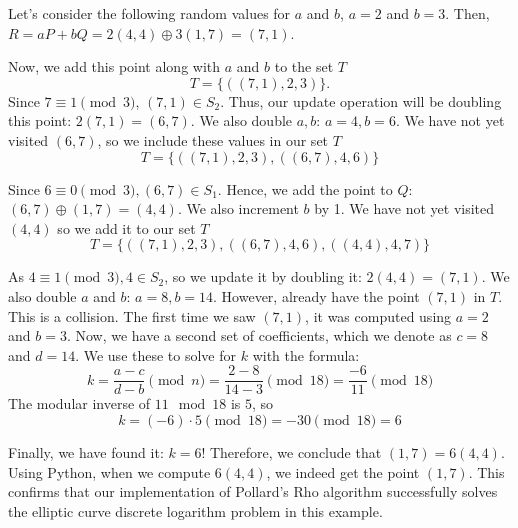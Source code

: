 \documentclass[11pt]{article}
\begin{document}
\vspace{0.3cm}

Let's consider the following random values for \(a\) and \(b\), \(a=2\) and \(b=3\). Then, \(R=aP+bQ=2(4,4)\oplus3(1,7)=(7,1)\).

Now, we add this point along with \(a\) and \(b\) to the set \(T\)
\[T=\{((7,1),2,3)\}.\]
Since \(7\equiv1 \pmod{3}\), \((7,1)\in S_2\). Thus, our update operation will be doubling this point: \(2(7,1)=(6,7)\). We also double \(a,b\): \(a=4,b=6\).
We have not yet visited \((6,7)\), so we include these values in our set \(T\)
\[T=\{((7,1),2,3), ((6,7),4,6)\}\]

Since \(6\equiv 0 \pmod{3},(6,7)\in S_1\). Hence, we add the point to \(Q\): \((6,7)\oplus (1,7)=(4,4)\). We also increment \(b\) by 1. We have not yet visited \((4,4)\) so we add it to our set \(T\)
\[T=\{((7,1),2,3), ((6,7),4,6), ((4,4),4,7)\}\]

As \(4\equiv 1 \pmod 3, 4\in S_2\), so we update it by doubling it: \(2(4,4)=(7,1)\).
We also double \(a\) and \(b\): \(a=8, b=14\). However, already have the point \((7,1)\) in \(T\). This is a collision. The first time we saw \((7,1)\), it was computed using \(a = 2\) and \(b = 3\). Now, we have a second set of coefficients, which we denote as \(c = 8\) and \(d = 14\). We use these to solve for \(k\) with the formula:
\[k = \frac{a - c}{d - b} \pmod{n} = \frac{2 - 8}{14 - 3} \pmod{18} = \frac{-6}{11} \pmod{18}\]
The modular inverse of \(11 \mod 18\) is \(5\), so
\[k = (-6) \cdot 5 \pmod{18} = -30 \pmod{18} = 6\]

Finally, we have found it: \(k = 6\)! Therefore, we conclude that \((1,7) = 6(4,4)\). Using Python, when we compute \(6(4,4)\), we indeed get the point \((1,7)\). This confirms that our implementation of Pollard’s Rho algorithm successfully solves the elliptic curve discrete logarithm problem in this example.
\end{document}
